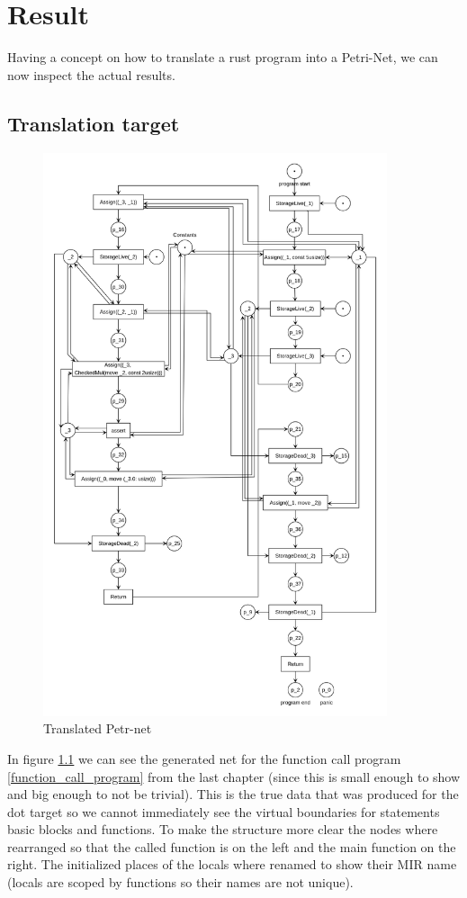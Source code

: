 \chapter{Result}
\label{results}
Having a concept on how to translate a rust program into a Petri-Net, we can now inspect the actual results.
\section{Translation target}
\begin{figure}
  \centering
  \includegraphics[width=0.9\textwidth]{../diagrams/FunctionCallNet.png}
  \caption{Translated Petr-net}
  \label{function_call_net}
\end{figure}
In figure \ref{function_call_net} we can see the generated net for the function call program \ref{function_call_program} from the last chapter (since this is small enough to show and big enough to not be trivial).
This is the true data that was produced for the dot target so we cannot immediately see the virtual boundaries for statements basic blocks and functions.
To make the structure more clear the nodes where rearranged so that the called function is on the left and the main function on the right.
The initialized places of the locals where renamed to show their MIR name (locals are scoped by functions so their names are not unique).

